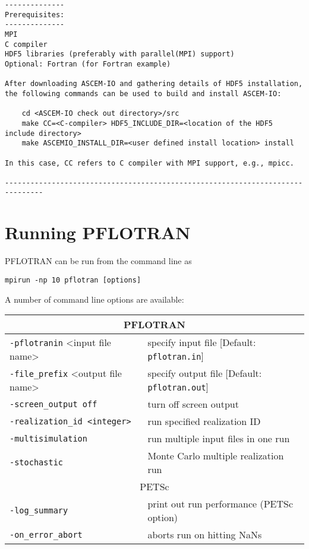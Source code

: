 \begin{verbatim}
--------------
Prerequisites:
--------------
MPI
C compiler
HDF5 libraries (preferably with parallel(MPI) support)
Optional: Fortran (for Fortran example)

After downloading ASCEM-IO and gathering details of HDF5 installation, 
the following commands can be used to build and install ASCEM-IO: 

	cd <ASCEM-IO check out directory>/src
	make CC=<C-compiler> HDF5_INCLUDE_DIR=<location of the HDF5 include directory>
	make ASCEMIO_INSTALL_DIR=<user defined install location> install

In this case, CC refers to C compiler with MPI support, e.g., mpicc.

-------------------------------------------------------------------------------
\end{verbatim}

\normalsize

\section{Running PFLOTRAN}

PFLOTRAN can be run from the command line as

\verb|mpirun -np 10 pflotran [options]|

A number of command line options are available:

\begin{tabular}{ll}
\toprule
\multicolumn{2}{c}{PFLOTRAN}\\
\midrule
{\tt -pflotranin} <input file name> & specify input file [Default: {\tt pflotran.in}]\\
{\tt -file\_prefix} <output file name> & specify output file [Default: {\tt pflotran.out}]\\
{\tt -screen\_output off} & turn off screen output\\
{\tt -realization\_id <integer>} & run specified realization ID\\
{\tt -multisimulation} & run multiple input files in one run\\
{\tt -stochastic} & Monte Carlo multiple realization run\\
\midrule
\multicolumn{2}{c}{PETSc}\\
\midrule
{\tt -log\_summary} & print out run performance (PETSc option)\\
{\tt -on\_error\_abort} & aborts run on hitting NaNs\\
\bottomrule
\end{tabular}

